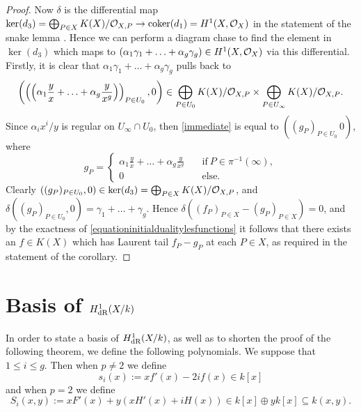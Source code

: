 \begin{proof}
    Now $\delta$ is the differential map $\ker(d_3) = \bigoplus_{P \in X}K(X)/{\cal O}_{X,P} \rightarrow \operatorname{coker}(d_1) = H^1(X,\mathcal{O}_X)$ in the statement of the snake lemma \cite[Lem.\ 1.3.2]{weibel}.
    Hence we can perform a diagram chase to find the element in $\ker(d_3)$ which maps to $\left( \alpha_1\gamma_1 + \ldots + \alpha_g\gamma_g \right) \in H^1(X,\mathcal{O}_X)$ via this differential.
    Firstly, it is clear that $\alpha_1\gamma_1 + \ldots + \alpha_g\gamma_g$ pulls back to 
        \begin{equation}\label{immediate}
        \left( \left(\left( \alpha_1\frac{y}{x} + \ldots + \alpha_g\frac{y}{x^g} \right) \right)_{P \in U_0}, 0\right) \in \bigoplus_{P \in U_0}K(X)/{\cal O}_{X,P} \times \bigoplus_{P \in U_\infty}K(X)/{\cal O}_{X,P}.
        \end{equation}
    Since $\alpha_ix^i/y$ is regular on $U_\infty \cap U_0$, then \eqref{immediate} is equal to $\left( (g_P)_{P \in U_0}\, 0\right)$, where
        \[
        g_P =
            \begin{cases}
            \alpha_1\frac{y}{x} + \ldots + \alpha_g\frac{y}{x^g} & \quad \text{if}\ P \in \pi^{-1}(\infty), \\
            0 & \quad \text{else.}
            \end{cases}
        \]
    Clearly $\left( (g_P)_{P \in U_0},0\right) \in \ker (d_3) = \bigoplus_{P \in X} K(X)/{\cal O}_{X,P}$, and $\delta \left( (g_P)_{P \in U_0}, 0 \right) = \gamma_1 + \ldots + \gamma_g$.
    Hence $\delta((f_P)_{P \in X} - (g_P)_{P \in X}) = 0$, and by the exactness of \eqref{equationinitialdualitylesfunctions} it follows that there exists an $f \in K(X)$ which has Laurent tail $f_P - g_P$ at each $P \in X$, as required in the statement of the corollary.
    \end{proof}

\section{Basis of $H^1_{\rm dR}(X/k)$}\label{sectionbasisofderham}

In order to state a basis of $H_{\text {dR}}^1(X/k)$, as well as to shorten the proof of the following theorem, we define the following polynomials. 
We suppose that $1 \leq i \leq g$.
Then when $p\neq 2$ we define
    \[
    s_i(x) := xf'(x) - 2if(x) \in k[x]
    \]
and when $p = 2$ we define
    \begin{equation}\label{equationSi}
    S_i(x,y) := xF'(x) + y(xH'(x) + iH(x))\in k[x]\oplus yk[x] \subseteq k(x,y).
    \end{equation}

